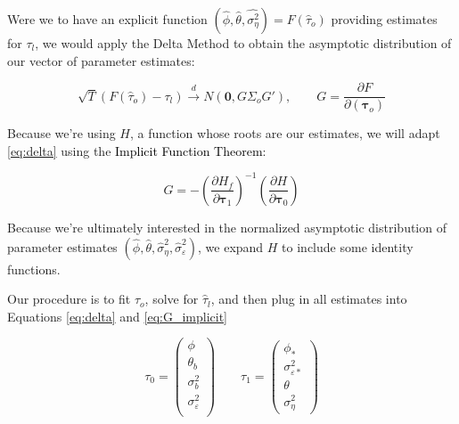  Were we to have an explicit function $(\hat{\phi},\hat{\theta},\hat{\sigma_\eta^2}) = F(\hat{\tau}_o)$ providing estimates for $\tau_l$, we would apply the Delta Method to obtain the asymptotic distribution of our vector of parameter estimates:

\begin{equation}
        \label{eq:delta}
    \sqrt{T}(F(\hat{\tau}_o) - \tau_l) \xrightarrow{d} N(\mathbf{0},G\Sigma_oG'), \qquad G = \frac{\partial F}{\partial (\bm{\tau}_{o})}
\end{equation}

Because we're using $H$, a function whose roots are our estimates, we will adapt \ref{eq:delta} using the \textcolor{black}{Implicit Function Theorem}:

\begin{equation}
    G = -\left(\frac{\partial H_f}{\partial \bm{\tau}_1}\right)^{-1}
  \left(\frac{\partial H}{\partial \bm{\tau}_0}\right)
  \label{eq:G_implicit}
\end{equation}

Because we're ultimately interested in the normalized asymptotic distribution of parameter estimates $(\hat{\phi}, \hat{\theta}, \hat{\sigma}_\eta^2, \hat{\sigma}_\varepsilon^2)$, we expand $H$ to include some identity functions. 


Our procedure is to fit $\hat{\tau}_o$, solve for $\hat{\tau}_l$, and then plug in all estimates into Equations \ref{eq:delta} and \ref{eq:G_implicit}

    \begin{equation}
    \tau_0 = \left(\begin{array}{c}
     \phi\\
     \theta_b \\
     \sigma_b^2 \\
     \sigma_\varepsilon^2 \\ 
    
\end{array}\right) 
\qquad
\tau_1 = \left(\begin{array}{c}
    \phi_* \\
    \sigma_{\varepsilon*}^2 \\
    \theta \\
    \sigma_\eta^2
\end{array}\right)
\end{equation}


